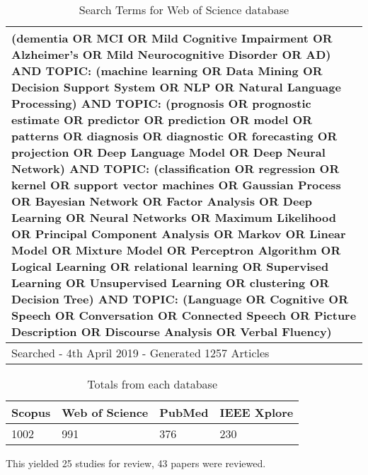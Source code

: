 \documentclass[12pt]{article}
\begin{document}
\begin{table}[H]
	\begin{center}
	\begin{tabular}{ p{12cm} }
	\hline
	(dementia OR MCI OR Mild Cognitive Impairment OR Alzheimer's OR Mild Neurocognitive Disorder OR AD) AND TOPIC: (machine learning OR Data Mining OR Decision Support System OR NLP OR Natural 			Language Processing) AND TOPIC: (prognosis OR prognostic estimate OR predictor OR prediction OR model OR patterns OR diagnosis OR diagnostic OR forecasting OR projection OR Deep Language Model 		OR Deep Neural Network) AND TOPIC: (classification OR regression OR kernel OR support vector machines OR Gaussian Process OR Bayesian Network OR Factor Analysis OR Deep Learning OR Neural 			Networks OR Maximum Likelihood OR Principal Component Analysis OR Markov OR Linear Model OR Mixture Model OR Perceptron Algorithm OR Logical Learning OR relational learning OR Supervised 				Learning OR Unsupervised Learning OR clustering OR Decision Tree) AND TOPIC: (Language OR Cognitive OR Speech OR Conversation OR Connected Speech OR Picture Description OR Discourse Analysis OR 		Verbal Fluency)  \\ \hline
	Searched - 4th April 2019 - Generated 1257 Articles \\
	\hline
	\end{tabular}
	\end{center}
	\caption[Table caption text]{Search Terms for Web of Science database}
	\label{table:name}
\end{table}

\begin{table}[H]
	\begin{center}
	\begin{tabular}{ p{3cm} | p{3cm} | p{3cm} | p{3cm} }
	\hline
	Scopus & Web of Science & PubMed & IEEE Xplore \\ \hline
	1002 & 991 & 376 & 230 \\ 
	\hline
	\end{tabular}
	\end{center}
	\caption[Table caption text]{Totals from each database}
	\label{table:name}
\end{table}

This yielded 25 studies for review, 43 papers were reviewed.
\end{document}
